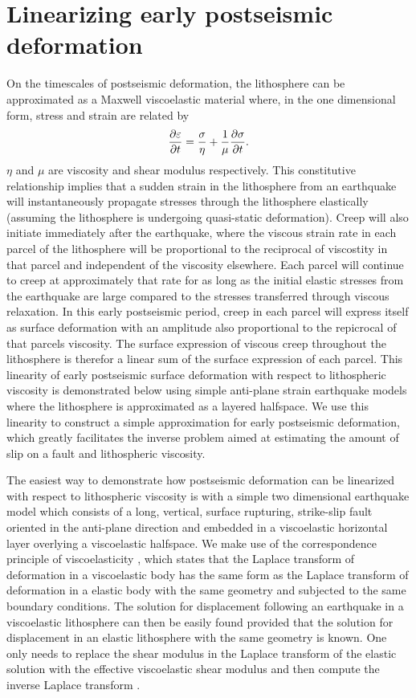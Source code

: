 \documentclass[12pt]{article}
\begin{document}
\section{Linearizing early postseismic deformation} 
On the timescales of postseismic deformation, the lithosphere can be
approximated as a Maxwell viscoelastic material where, in the one
dimensional form, stress and strain are related by
\begin{equation}
  \frac{\partial\bold{\varepsilon}}{\partial t}=\frac{\bold{\sigma}}{\eta} + 
                              \frac{1}{\mu}\frac{\partial\bold{\sigma}}{\partial t}.
\end{equation}
$\eta$ and $\mu$ are viscosity and shear modulus respectively.  This
constitutive relationship implies that a sudden strain in the
lithosphere from an earthquake will instantaneously propagate stresses
through the lithosphere elastically (assuming the lithosphere is
undergoing quasi-static deformation).  Creep will also initiate
immediately after the earthquake, where the viscous strain rate in
each parcel of the lithosphere will be proportional to the reciprocal
of viscostity in that parcel and independent of the viscosity
elsewhere.  Each parcel will continue to creep at approximately that
rate for as long as the initial elastic stresses from the earthquake
are large compared to the stresses transferred through viscous
relaxation.  In this early postseismic period, creep in each parcel
will express itself as surface deformation with an amplitude also
proportional to the repicrocal of that parcels viscosity.  The surface
expression of viscous creep throughout the lithosphere is therefor a
linear sum of the surface expression of each parcel.  This linearity
of early postseismic surface deformation with respect to lithospheric
viscosity is demonstrated below using simple anti-plane strain
earthquake models where the lithosphere is approximated as a layered
halfspace.  We use this linearity to construct a simple approximation
for early postseismic deformation, which greatly facilitates the
inverse problem aimed at estimating the amount of slip on a fault and
lithospheric viscosity.

The easiest way to demonstrate how postseismic deformation can be
linearized with respect to lithospheric viscosity is with a simple two
dimensional earthquake model which consists of a long, vertical,
surface rupturing, strike-slip fault oriented in the anti-plane
direction and embedded in a viscoelastic horizontal layer overlying a
viscoelastic halfspace.  We make use of the correspondence principle
of viscoelasticity \citep{F1975}, which states that the Laplace
transform of deformation in a viscoelastic body has the same form as
the Laplace transform of deformation in a elastic body with the same
geometry and subjected to the same boundary conditions. The solution
for displacement following an earthquake in a viscoelastic lithosphere
can then be easily found provided that the solution for displacement
in an elastic lithosphere with the same geometry is known.  One only
needs to replace the shear modulus in the Laplace transform of the
elastic solution with the effective viscoelastic shear modulus and
then compute the inverse Laplace transform
\citep[e.g.][]{HH2005,NM1974,SP1978}.
\end{document}
